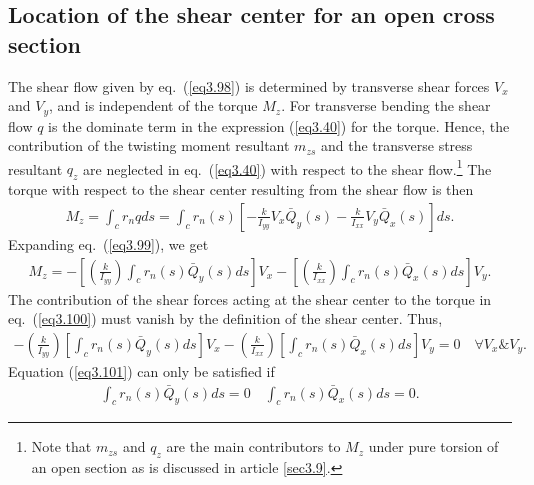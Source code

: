 \documentclass{AeroStructure-ERJohnson}
\begin{document}
\setcounter{equation}{98}
\subsection{Location of the shear center for an open cross section}\label{sec3.8.2}

The shear flow given by eq.~(\ref{eq3.98}) is determined by transverse shear forces $V_x$ and $V_y$, and is independent of the torque $M_z$. For transverse bending the shear flow $q$ is the dominate term in the expression (\ref{eq3.40}) for the torque. Hence, the contribution of the twisting moment resultant $m_{zs}$ and the transverse stress resultant $q_z$ are neglected in eq.~(\ref{eq3.40}) with respect to the shear flow.\footnote{Note that $m_{zs}$ and $q_z$ are the main contributors to $M_z$ under pure torsion of an open section as is discussed in article \ref{sec3.9}.} The torque with respect to the shear center resulting from the shear flow is then
\begin{align}\label{eq3.99}
M_{z}=\int_{c} r_{n} q d s=\int_{c} r_{n}(s)\left[-\frac{k}{I_{y y}} V_{x} \bar{Q}_{y}(s)-\frac{k}{I_{x x}} V_{y} \bar{Q}_{x}(s)\right] d s.
\end{align}
Expanding eq.~(\ref{eq3.99}), we get
\begin{align}\label{eq3.100}
M_{z}=-\left[\left(\frac{k}{I_{y y}}\right) \int_{c} r_{n}(s) \bar{Q}_{y}(s) d s\right] V_{x}-\left[\left(\frac{k}{I_{x x}}\right) \int_{c} r_{n}(s) \bar{Q}_{x}(s) d s\right] V_{y}.
\end{align}
The contribution of the shear forces acting at the shear center to the torque in eq.~(\ref{eq3.100}) must vanish by the definition of the shear center. Thus,
\begin{align}\label{eq3.101}
-\left(\frac{k}{I_{y y}}\right)\left[\int_{c} r_{n}(s) \bar{Q}_{y}(s) d s \right] V_{x}-\left(\frac{k}{I_{x x}}\right)\left[\int_{c} r_{n}(s) \bar{Q}_{x}(s) d s \right] V_{y}=0 \quad \forall V_{x} \& V_{y}.
\end{align}
Equation (\ref{eq3.101}) can only be satisfied if
\begin{align}\label{eq3.102}
\int_{c} r_{n}(s) \bar{Q}_{y}(s) d s=0 \quad \int_{c} r_{n}(s) \bar{Q}_{x}(s) d s=0.
\end{align}

\vspace*{-1pc}
\end{document}
